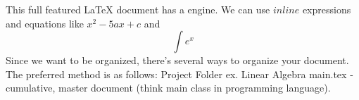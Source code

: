 \markdownRendererUlBegin
\markdownRendererUlItem This full featured LaTeX document has a  engine.\markdownRendererUlItemEnd 
\markdownRendererUlItem We can use $inline$ expressions and equations like $x^2-5ax+c$ and $$\int e^x$$\markdownRendererUlItemEnd 
\markdownRendererUlEnd \markdownRendererInterblockSeparator
{}\markdownRendererInterblockSeparator
{}Since we want to be organized, there's several ways to organize your document. The preferred method is as follows:\markdownRendererInterblockSeparator
{}\markdownRendererUlBeginTight
\markdownRendererUlItem Project Folder ex. Linear Algebra\markdownRendererInterblockSeparator
{}\markdownRendererUlBeginTight
\markdownRendererUlItem main.tex - cumulative, master document (think main class in programming language).\markdownRendererUlItemEnd 
\markdownRendererUlEndTight \markdownRendererUlItemEnd 
\markdownRendererUlEndTight \relax